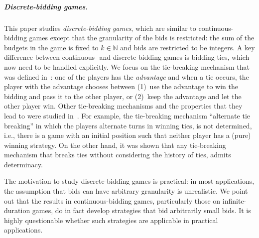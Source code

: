 \documentclass{article}\providecommand{\nequiv}{\not\equiv}\usepackage[a4paper,margin=20mm]{geometry}
\newcommand{\Nat}{\mathbb{N}}
\begin{document}
\subparagraph*{Discrete-bidding games.}
This paper studies {\em discrete-bidding games}, which are similar to continuous-bidding games except that the granularity of the bids is restricted: the sum of the budgets in the game is fixed to $k \in \Nat$ and bids are restricted to be integers. A key difference between continuous- and discrete-bidding games is bidding ties, which now need to be handled explicitly. We focus on the tie-breaking mechanism that was defined in~\cite{DP10}: one of the players has the {\em advantage} and when a tie occurs, the player with the advantage chooses between (1)~use the advantage to win the bidding and pass it to the other player, or (2)~keep the advantage and let the other player win. Other tie-breaking mechanisms and the properties that they lead to were studied in~\cite{AAH21}. For example, the tie-breaking mechanism ``alternate tie breaking'' in which the players alternate turns in winning ties, is not determined, i.e., there is a game with an initial position such that neither player has a (pure) winning strategy. On the other hand, it was shown that any tie-breaking mechanism that breaks ties without considering the history of ties, admits determinacy. 




The motivation to study discrete-bidding games is practical: in most applications, the assumption that bids can have arbitrary granularity is unrealistic. We point out that the results in continuous-bidding games, particularly those on infinite-duration games, do in fact develop strategies that bid arbitrarily small bids. It is highly questionable whether such strategies are applicable in practical applications. 
\end{document}
